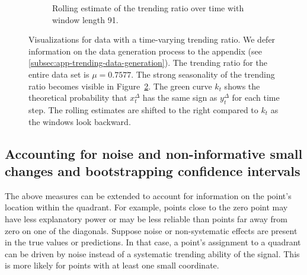 \documentclass[pdflatex]{sn-jnl}
\theoremstyle{plain}%
\theoremstyle{definition}
\newcommand{\diffxt}[1][t]{x^{\Delta}_{#1}}
\newcommand{\diffyt}[1][t]{y^{\Delta}_{#1}}
\begin{document}
\begin{figure}
\begin{subfigure}[t]{.48\textwidth}
    \caption{Rolling estimate of the trending ratio over time with window length 91. }\label{fig:trending_ratio_time_series}
    \end{subfigure}%
    \caption[Visualizations of the four-quadrant plot for data with a time-varying trending ratio.]{Visualizations for data with a time-varying trending ratio. We defer information on the data generation process to the appendix (see \ref{subsec:app-trending-data-generation}). The trending ratio for the entire data set is $\mu = 0.7577$. The strong seasonality of the trending ratio becomes visible in Figure~\ref{fig:trending_ratio_time_series}. The green curve $k_t$ shows the theoretical probability that $\diffxt$ has the same sign as $\diffyt$ for each time step. The rolling estimates are shifted to the right compared to $k_t$ as the windows look backward.}
\end{figure}

\subsection{Accounting for noise and non-informative small changes and bootstrapping confidence intervals}\label{subsec:aatc-noise}

The above measures can be extended to account for information on the point's location within the quadrant.
For example, points close to the zero point may have less explanatory power or may be less reliable than points far away from zero on one of the diagonals.
Suppose noise or non-systematic effects are present in the true values or predictions.
In that case, a point's assignment to a quadrant can be driven by noise instead of a systematic trending ability of the signal.
This is more likely for points with at least one small coordinate.
\end{document}
